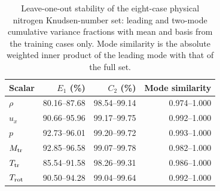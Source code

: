\begin{table}
\centering\small
\caption{Leave-one-out stability of the eight-case physical nitrogen Knudsen-number set: leading and two-mode cumulative variance fractions with mean and basis from the training cases only. Mode similarity is the absolute weighted inner product of the leading mode with that of the full set.}\label{tab:app_loo_pod_clean}
\begin{tabular}{lrrr}\toprule
Scalar & $E_1$ (\%) & $C_2$ (\%) & Mode similarity\\\midrule
$\rho$ & 80.16--87.68 & 98.54--99.14 & 0.974--1.000\\
$u_x$ & 90.66--95.96 & 99.17--99.75 & 0.992--1.000\\
$p$ & 92.73--96.01 & 99.20--99.72 & 0.993--1.000\\
$M_{\rm tr}$ & 92.85--96.58 & 99.07--99.78 & 0.982--1.000\\
$T_{\rm tr}$ & 85.54--91.58 & 98.26--99.31 & 0.986--1.000\\
$T_{\rm rot}$ & 90.50--94.28 & 99.04--99.64 & 0.992--1.000\\
\bottomrule\end{tabular}
\end{table}
